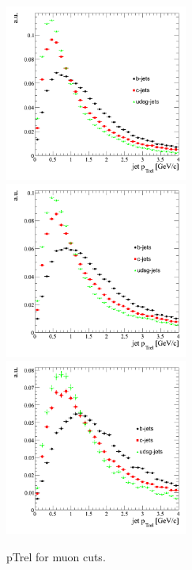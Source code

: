 \begin{figure}[htbp]
  \begin{center}
    \includegraphics[width=60mm]{Figures/jet_ptrel_mu6.png}
    \includegraphics[width=60mm]{Figures/jet_ptrel_mu10.png}
    \includegraphics[width=60mm]{Figures/jet_ptrel_mu20.png}
  \end{center}
  \caption{pTrel for muon cuts.}
  \label{fig:jet_ptrel}
\end{figure}

